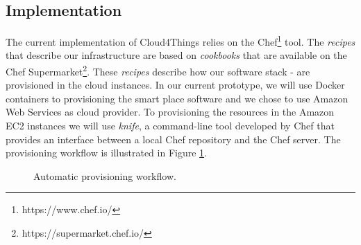 \subsection{Implementation}
\label{sub:implementation}
The current implementation of Cloud4Things relies on the Chef\footnote{https://www.chef.io/} tool.
The \textit{recipes} that describe our infrastructure are based on \textit{cookbooks} that are available on the
Chef Supermarket\footnote{https://supermarket.chef.io/}. These \textit{recipes} describe how our software stack -
are provisioned in the cloud instances. In our current prototype, we will use Docker containers to provisioning
the smart place software and we chose to use Amazon Web Services as cloud provider. To provisioning the
resources in the Amazon EC2 instances we will use \textit{knife}, a command-line tool developed by Chef that provides
an interface between a local Chef repository and the Chef server. The provisioning workflow is illustrated
in Figure \ref{fig:automatic_provisioning}.
\begin{figure}[!ht]
  \centering
  \caption{Automatic provisioning workflow.}
  \label{fig:automatic_provisioning}
\end{figure}

